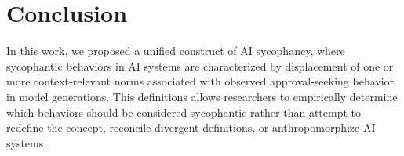 

\section{Conclusion}

In this work, we proposed a unified construct of AI sycophancy, where sycophantic behaviors in AI systems are characterized by displacement of one or more context-relevant norms associated with observed approval-seeking behavior in model generations. This definitions allows researchers to empirically determine which behaviors should be considered sycophantic rather than attempt to redefine the concept, reconcile divergent definitions, or anthropomorphize AI systems. 

